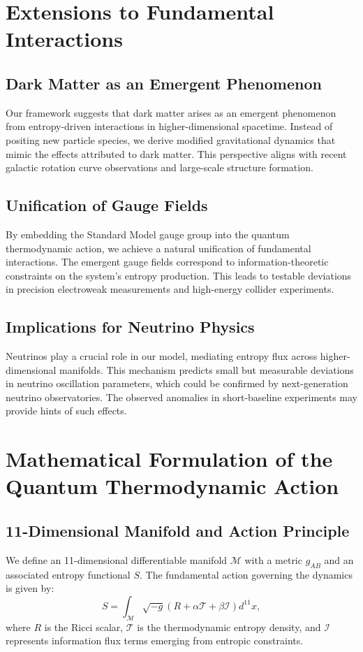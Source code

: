 \documentclass{article}
\begin{document}
\section{Extensions to Fundamental Interactions}

\subsection{Dark Matter as an Emergent Phenomenon}
Our framework suggests that dark matter arises as an emergent phenomenon from entropy-driven interactions in higher-dimensional spacetime. Instead of positing new particle species, we derive modified gravitational dynamics that mimic the effects attributed to dark matter. This perspective aligns with recent galactic rotation curve observations and large-scale structure formation.

\subsection{Unification of Gauge Fields}
By embedding the Standard Model gauge group into the quantum thermodynamic action, we achieve a natural unification of fundamental interactions. The emergent gauge fields correspond to information-theoretic constraints on the system's entropy production. This leads to testable deviations in precision electroweak measurements and high-energy collider experiments.

\subsection{Implications for Neutrino Physics}
Neutrinos play a crucial role in our model, mediating entropy flux across higher-dimensional manifolds. This mechanism predicts small but measurable deviations in neutrino oscillation parameters, which could be confirmed by next-generation neutrino observatories. The observed anomalies in short-baseline experiments may provide hints of such effects.

\section{Mathematical Formulation of the Quantum Thermodynamic Action}

\subsection{11-Dimensional Manifold and Action Principle}
We define an 11-dimensional differentiable manifold $\mathcal{M}$ with a metric $g_{AB}$ and an associated entropy functional $S$. The fundamental action governing the dynamics is given by:
\begin{equation}
S = \int_\mathcal{M} \sqrt{-g} \left( R + \alpha \mathcal{T} + \beta \mathcal{I} \right) d^{11}x,
\end{equation}
where $R$ is the Ricci scalar, $\mathcal{T}$ is the thermodynamic entropy density, and $\mathcal{I}$ represents information flux terms emerging from entropic constraints.
\end{document}
